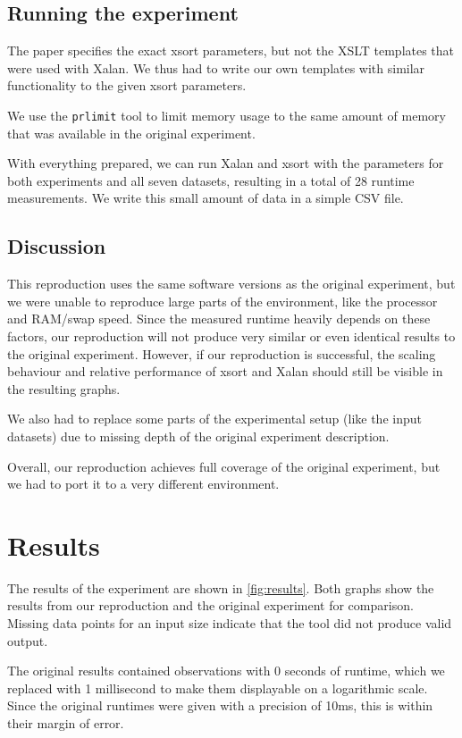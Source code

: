 \documentclass[sigconf,nonacm]{acmart}
\begin{document}
\subsection{Running the experiment}

The paper specifies the exact xsort parameters, but not the XSLT templates that were used with Xalan. We thus had to write our own templates with similar functionality to the given xsort parameters.

We use the \lstinline{prlimit} tool to limit memory usage to the same amount of memory that was available in the original experiment.

With everything prepared, we can run Xalan and xsort with the parameters for both experiments and all seven datasets, resulting in a total of 28 runtime measurements. We write this small amount of data in a simple CSV file.

\subsection{Discussion}

This reproduction uses the same software versions as the original experiment, but we were unable to reproduce large parts of the environment, like the processor and RAM/swap speed. Since the measured runtime heavily depends on these factors, our reproduction will not produce very similar or even identical results to the original experiment. However, if our reproduction is successful, the scaling behaviour and relative performance of xsort and Xalan should still be visible in the resulting graphs.

We also had to replace some parts of the experimental setup (like the input datasets) due to missing depth of the original experiment description.

Overall, our reproduction achieves full coverage of the original experiment, but we had to port it to a very different environment.


\section{Results}

The results of the experiment are shown in \autoref{fig:results}. Both graphs show the results from our reproduction and the original experiment for comparison. Missing data points for an input size indicate that the tool did not produce valid output.

The original results contained observations with 0 seconds of runtime, which we replaced with 1 millisecond to make them displayable on a logarithmic scale. Since the original runtimes were given with a precision of 10ms, this is within their margin of error.
\end{document}
